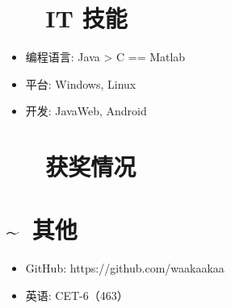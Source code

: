 \documentclass{resume}
\begin{document}
\section{\faCogs\ ~~IT 技能}
\begin{itemize}[parsep=0.5ex]
  \item 编程语言: Java > C == Matlab
  \item 平台: Windows, Linux
  \item 开发: JavaWeb, Android
\end{itemize}

\section{\faHeartO\ ~~获奖情况}
\vspace{1mm}
\vspace{1mm}
\vspace{1mm}

\section{\faInfo\~~其他}
\begin{itemize}[parsep=0.5ex]
  \item GitHub: https://github.com/waakaakaa
  \item 英语: CET-6（463）
\end{itemize}
\end{document}
